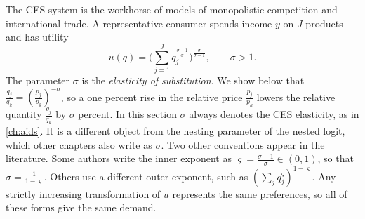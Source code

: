The CES system is the workhorse of models of monopolistic competition and international trade. A representative
consumer spends income $y$ on $J$ products and has utility
\begin{equation}\label{eq:04-ces-utility}
u(q) = \Big(\sum_{j=1}^J q_j^{\frac{\sigma-1}{\sigma}}\Big)^{\frac{\sigma}{\sigma-1}}, \qquad \sigma > 1 .
\end{equation}
The parameter $\sigma$ is the \emph{elasticity of substitution}. We show below that
$\frac{q_j}{q_k} = (\frac{p_j}{p_k})^{-\sigma}$, so a one percent rise in the relative price $\frac{p_j}{p_k}$
lowers the relative quantity $\frac{q_j}{q_k}$ by $\sigma$ percent. In this section $\sigma$ always denotes the CES
elasticity, as in \cref{ch:aids}. It is a different object from the nesting parameter of the nested logit, which
other chapters also write as $\sigma$. Two other conventions appear in the literature. Some authors write the
inner exponent as $\varsigma = \frac{\sigma - 1}{\sigma} \in (0,1)$, so that $\sigma = \frac{1}{1-\varsigma}$. Others use a different
outer exponent, such as $(\sum_j q_j^\varsigma)^{1-\varsigma}$. Any strictly increasing transformation of $u$ represents the same
preferences, so all of these forms give the same demand.


